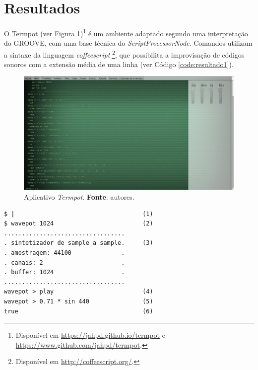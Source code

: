 \section{Resultados}\label{sec:termpot}

O Termpot (ver Figura \ref{fig:termpot})\footnote{Disponível em \url{https://jahpd.github.io/termpot} e \url{https://www.github.com/jahpd/termpot}.} é um ambiente adaptado segundo uma interpretação do GROOVE, com uma base técnica do \emph{ScriptProcessorNode}. Comandos utilizam a sintaxe da linguagem \emph{coffeescript} \cite{burnham2011coffeescript}\footnote{Disponível em \url{http://coffeescript.org/}.}, que possibilita a improvisação de códigos sonoros com a extensão média de uma linha (ver Código \ref{code:resultado1}). %

\begin{figure}[!h]
\centering
\includegraphics[scale=0.3]{termpot.png}
\caption{Aplicativo \emph{Termpot}. \textbf{Fonte}: autores.}
\label{fig:termpot}
\end{figure}

\begin{listing}
\begin{verbatim}
$ |                                    (1)
$ wavepot 1024                         (2)
..................................
. sintetizador de sample a sample.     (3) 
. amostragem: 44100              .
. canais: 2                      .
. buffer: 1024                   .
..................................
wavepot > play                         (4)
wavepot > 0.71 * sin 440               (5)
true                                   (6)
\end{verbatim}
\caption{Mensagem de inicialização do sistema (0). Console do \emph{Termpot} aguardando dados de entrada do improvisador (1). O improvisador inicia o ambiente \emph{wavepot} com um buffer de 1024 amostras por ciclo de DSP (2). Informações diversas do sistema de áudio inicializado (3). O improvisador inicia o processamento de áudio (4). O improvisador define o processamento de áudio (5). O sistema informa que o processamento ocorreu sem problemas (6).}
\label{code:resultado1}
\end{listing}

